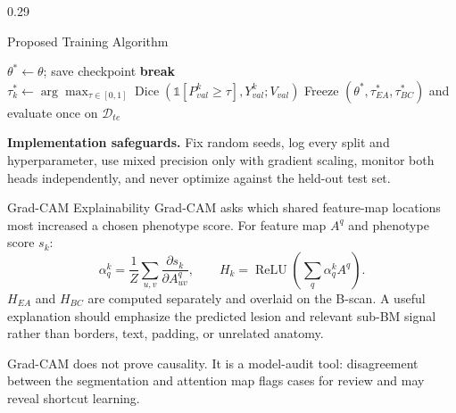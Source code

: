 \documentclass[final]{beamer}
\begin{document}
\begin{frame}[t]
\begin{columns}[t,totalwidth=\dimexpr\paperwidth-4cm\relax]
\begin{column}{0.29\textwidth}
\begin{block}{Proposed Training Algorithm}
{\begin{algorithm}[H]
\begin{algorithmic}[1]
            \State $\theta^*\gets\theta$; save checkpoint
            \State \textbf{break}
          \EndIf
        \EndFor
          \State $\tau_k^*\gets\arg\max_{\tau\in[0,1]}
            \operatorname{Dice}(\mathbb 1[P_{val}^{k}\geq\tau],Y_{val}^{k};V_{val})$
        \EndFor
        \State Freeze $(\theta^*,\tau_{EA}^*,\tau_{BC}^*)$ and evaluate once
          on $\mathcal D_{te}$
      \end{algorithmic}
    \end{algorithm}
    }

    \textbf{Implementation safeguards.} Fix random seeds, log every split and
    hyperparameter, use mixed precision only with gradient scaling, monitor both
    heads independently, and never optimize against the held-out test set.
  \end{block}

  \begin{block}{Grad-CAM Explainability}
    Grad-CAM asks which shared feature-map locations most increased a chosen
    phenotype score. For feature map $A^q$ and phenotype score $s_k$:
    \[
      \alpha_q^k=\frac{1}{Z}\sum_{u,v}
      \frac{\partial s_k}{\partial A^q_{uv}},\qquad
      H_k=\operatorname{ReLU}\!\left(\sum_q\alpha_q^k A^q\right).
    \]
    $H_{EA}$ and $H_{BC}$ are computed separately and overlaid on the B-scan.
    A useful explanation should emphasize the predicted lesion and relevant
    sub-BM signal rather than borders, text, padding, or unrelated anatomy.

    \vspace{0.35cm}
    Grad-CAM does not prove causality. It is a model-audit tool: disagreement
    between the segmentation and attention map flags cases for review and may
    reveal shortcut learning.
  \end{block}

\end{column}

\end{columns}

\vfill
{}

\end{frame}
\end{document}
